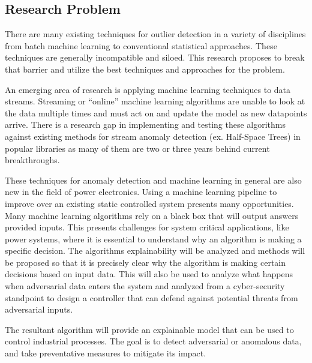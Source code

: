 \subsection{Research Problem}

There are many existing techniques for outlier detection in a variety of disciplines from batch machine learning to conventional statistical approaches. These techniques are generally incompatible and siloed. This research proposes to break that barrier and utilize the best techniques and approaches for the problem.

An emerging area of research is applying machine learning techniques to data streams. Streaming or \enquote{online} machine learning algorithms are unable to look at the data multiple times and must act on and update the model as new datapoints arrive. There is a research gap in implementing and testing these algorithms against existing methods for stream anomaly detection (ex. Half-Space Trees) in popular libraries as many of them are two or three years behind current breakthroughs.

These techniques for anomaly detection and machine learning in general are also new in the field of power electronics. Using a machine learning pipeline to improve over an existing static controlled system presents many opportunities. Many machine learning algorithms rely on a black box that will output answers provided inputs. This presents challenges for system critical applications, like power systems, where it is essential to understand why an algorithm is making a specific decision. The algorithms explainability will be analyzed and methods will be proposed so that it is precisely clear why the algorithm is making certain decisions based on input data. This will also be used to analyze what happens when adversarial data enters the system and analyzed from a cyber-security standpoint to design a controller that can defend against potential threats from adversarial inputs.

The resultant algorithm will provide an explainable model that can be used to control industrial processes. The goal is to detect adversarial or anomalous data, and take preventative measures to mitigate its impact.


